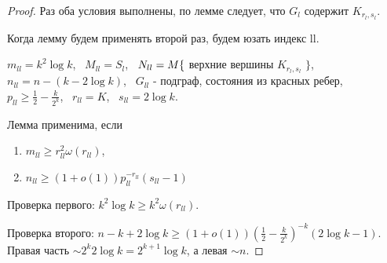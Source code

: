 \begin{proof}
    Раз оба условия выполнены, по лемме следует, что $G_l$ содержит $K_{r_l, s_l}$.

    Когда лемму будем применять второй раз, будем юзать индекс ll.

    $m_{ll} = k^2 \log k$, \
    $M_{ll} = S_l$, \
    $N_{ll} = M \\ \{$ верхние вершины $K_{r_l, s_l}$  $\}$, \
    $n_{ll} = n - (k - 2 \log k)$, \
    $G_{ll}$ - подграф, состояния из красных ребер, \
    $p_{ll} \ge \frac{1}{2} - \frac{k}{2^k}$, \
    $r_{ll} = K$, \
    $s_{ll} = 2 \log k$.

    Лемма применима, если 
    \begin{enumerate}
        \item $m_{ll} \ge r_{ll}^2 \omega(r_{ll})$,
        \item $n_{ll} \ge (1 + o(1))p_{ll}^{-r_{ll}}(s_{ll} - 1)$
    \end{enumerate}

    Проверка первого: $k^2 \log k \ge k^2 \omega(r_{ll})$.

    Проверка второго: $n - k + 2 \log k \ge (1 + o(1))(\frac{1}{2} - \frac{k}{2^k})^{-k} (2 \log k - 1)$.
    Правая часть $ \sim 2^k 2 \log k = 2^{k+1} \log k$, а левая $ \sim n $.
\end{proof}


